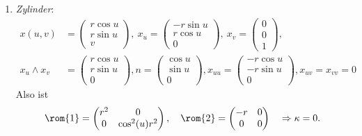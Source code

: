 \begin{example}
\begin{enumerate}
    \item \emph{Zylinder}:
    \begin{align*}
      x(u,v) &= \left( \begin{smallmatrix}
      r\cos u \\ r\sin u \\ v
    \end{smallmatrix} \right), \ x_u = \left( \begin{smallmatrix}
      -r\sin u \\ r\cos u \\ 0
    \end{smallmatrix} \right), \ x_v = \left( \begin{smallmatrix}
      0 \\ 0 \\ 1
    \end{smallmatrix} \right), \\
    x_u \wedge x_v &= \left( \begin{smallmatrix}
      r\cos u \\
      r\sin u \\
      0
    \end{smallmatrix} \right), n = \left( \begin{smallmatrix}
      \cos u \\ \sin u \\ 0
    \end{smallmatrix} \right), x_{uu} = \left( \begin{smallmatrix}
      -r\cos u \\ -r\sin u \\ 0
    \end{smallmatrix} \right), x_{uv} = x_{vv} = 0
    \end{align*}
    Also ist
    \begin{equation*}
      \rom{1} = \begin{pmatrix}
        r^2 & 0 \\
        0 & \cos^2(u)r^2
      \end{pmatrix}, \quad \rom{2} = \begin{pmatrix}
        -r & 0 \\
        0 & 0
      \end{pmatrix} \quad \Rightarrow \kappa = 0\text{.}
    \end{equation*}


\end{enumerate}
\end{example}
